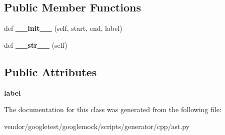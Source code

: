 \subsection*{Public Member Functions}
\begin{DoxyCompactItemize}
\item 
def {\bfseries \+\_\+\+\_\+init\+\_\+\+\_\+} (self, start, end, label)\hypertarget{classcpp_1_1ast_1_1Goto_a928e79374a90d01fc060985ea1e45260}{}\label{classcpp_1_1ast_1_1Goto_a928e79374a90d01fc060985ea1e45260}

\item 
def {\bfseries \+\_\+\+\_\+str\+\_\+\+\_\+} (self)\hypertarget{classcpp_1_1ast_1_1Goto_a508b6bc091cf06bfed73a33368c236c9}{}\label{classcpp_1_1ast_1_1Goto_a508b6bc091cf06bfed73a33368c236c9}

\end{DoxyCompactItemize}
\subsection*{Public Attributes}
\begin{DoxyCompactItemize}
\item 
{\bfseries label}\hypertarget{classcpp_1_1ast_1_1Goto_a685284ea5f3b21f39aff7f5db841c8f5}{}\label{classcpp_1_1ast_1_1Goto_a685284ea5f3b21f39aff7f5db841c8f5}

\end{DoxyCompactItemize}


The documentation for this class was generated from the following file\+:\begin{DoxyCompactItemize}
\item 
vendor/googletest/googlemock/scripts/generator/cpp/ast.\+py\end{DoxyCompactItemize}

